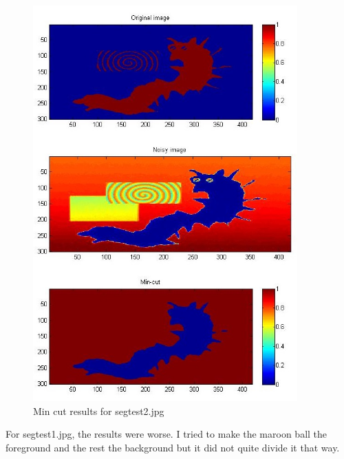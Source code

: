 \documentclass[11pt,psfig]{article}
\begin{document}
\begin{figure}[H]
\centering
\includegraphics[width=4in]{prob5plotA.jpg}
\caption{Min cut results for segtest2.jpg}
\end{figure}

For segtest1.jpg, the results were worse. I tried to make the maroon ball the foreground and the rest the background but it did not quite divide it that way.
\end{document}
